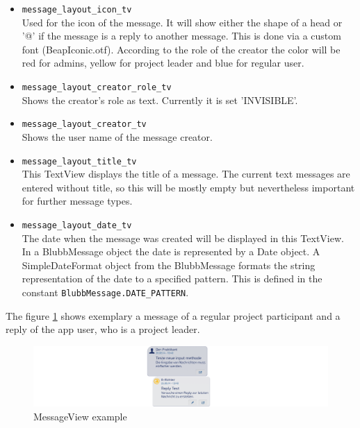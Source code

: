 \documentclass[12pt,a4paper,oneside]{report}
\newcommand{\code}[1]{\lstinline{#1}}
\begin{document}
\begin{itemize}
\item \code{message_layout_icon_tv}\\
Used for the icon of the message. It will show either the shape of a head or '@' if the message is a reply to another message. This is done via a custom font (BeapIconic.otf). According to the role of the creator the color will be red for admins, yellow for project leader and blue for regular user.

\item \code{message_layout_creator_role_tv}\\
Shows the creator's role as text. Currently it is set 'INVISIBLE'.

\item \code{message_layout_creator_tv}\\
Shows the user name of the message creator.

\item \code{message_layout_title_tv}\\
This TextView displays the title of a message. The current text messages are entered without title, so this will be mostly empty but nevertheless important for further message types.

\item \code{message_layout_date_tv}\\
The date when the message was created will be displayed in this TextView. In a BlubbMessage object the date is represented by a Date object. A SimpleDateFormat object from the BlubbMessage formats the string representation of the date to a specified pattern. This is defined in the constant \code{BlubbMessage.DATE_PATTERN}.

\end{itemize}

The figure \ref{fig:MessageViewEx} shows exemplary a message of a regular project participant and a reply of the app user, who is a project leader.
\begin{figure}[!ht]
	\centering
    \includegraphics[width=\linewidth]{MessageView.png}
	\caption{MessageView example}
	\label{fig:MessageViewEx}
\end{figure}
\end{document}
